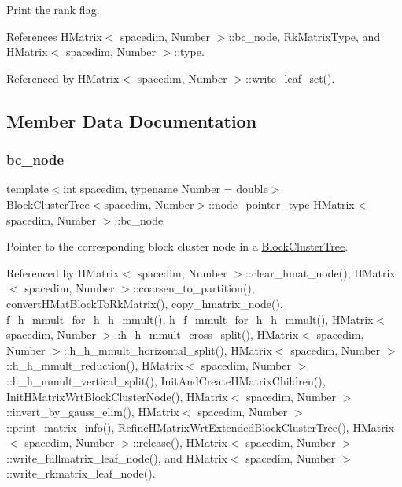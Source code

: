 Print the {\ttfamily rank} flag.

References H\+Matrix$<$ spacedim, Number $>$\+::bc\+\_\+node, Rk\+Matrix\+Type, and H\+Matrix$<$ spacedim, Number $>$\+::type.



Referenced by H\+Matrix$<$ spacedim, Number $>$\+::write\+\_\+leaf\+\_\+set().



\subsection{Member Data Documentation}
\mbox{\label{classHMatrix_a4a304494c970b5b267be1d8459d51586}} 
\subsubsection{\texorpdfstring{bc\+\_\+node}{bc\_node}}
{\footnotesize\ttfamily template$<$int spacedim, typename Number = double$>$ \\
\hyperlink{classBlockClusterTree}{Block\+Cluster\+Tree}$<$spacedim, Number$>$\+::node\+\_\+pointer\+\_\+type \hyperlink{classHMatrix}{H\+Matrix}$<$ spacedim, Number $>$\+::bc\+\_\+node\hspace{0.3cm}{\ttfamily [private]}}

Pointer to the corresponding block cluster node in a \hyperlink{classBlockClusterTree}{Block\+Cluster\+Tree}. 

Referenced by H\+Matrix$<$ spacedim, Number $>$\+::clear\+\_\+hmat\+\_\+node(), H\+Matrix$<$ spacedim, Number $>$\+::coarsen\+\_\+to\+\_\+partition(), convert\+H\+Mat\+Block\+To\+Rk\+Matrix(), copy\+\_\+hmatrix\+\_\+node(), f\+\_\+h\+\_\+mmult\+\_\+for\+\_\+h\+\_\+h\+\_\+mmult(), h\+\_\+f\+\_\+mmult\+\_\+for\+\_\+h\+\_\+h\+\_\+mmult(), H\+Matrix$<$ spacedim, Number $>$\+::h\+\_\+h\+\_\+mmult\+\_\+cross\+\_\+split(), H\+Matrix$<$ spacedim, Number $>$\+::h\+\_\+h\+\_\+mmult\+\_\+horizontal\+\_\+split(), H\+Matrix$<$ spacedim, Number $>$\+::h\+\_\+h\+\_\+mmult\+\_\+reduction(), H\+Matrix$<$ spacedim, Number $>$\+::h\+\_\+h\+\_\+mmult\+\_\+vertical\+\_\+split(), Init\+And\+Create\+H\+Matrix\+Children(), Init\+H\+Matrix\+Wrt\+Block\+Cluster\+Node(), H\+Matrix$<$ spacedim, Number $>$\+::invert\+\_\+by\+\_\+gauss\+\_\+elim(), H\+Matrix$<$ spacedim, Number $>$\+::print\+\_\+matrix\+\_\+info(), Refine\+H\+Matrix\+Wrt\+Extended\+Block\+Cluster\+Tree(), H\+Matrix$<$ spacedim, Number $>$\+::release(), H\+Matrix$<$ spacedim, Number $>$\+::write\+\_\+fullmatrix\+\_\+leaf\+\_\+node(), and H\+Matrix$<$ spacedim, Number $>$\+::write\+\_\+rkmatrix\+\_\+leaf\+\_\+node().

